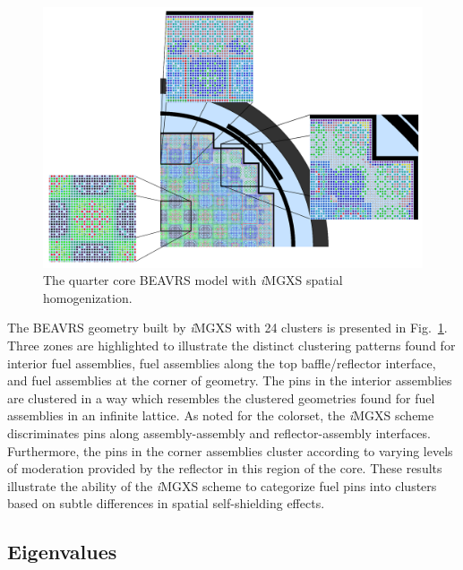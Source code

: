 \documentclass[12pt,twoside]{mitthesis-exec}
\begin{document}
\begin{figure}[h!]
\centering
\includegraphics[width=\linewidth]{figures/unsupervised/geometries/with-features/8-clusters/combined/full-core-zoom}
\caption[Materials for the BEAVRS]{The quarter core BEAVRS model with \textit{i}MGXS spatial homogenization.}
\label{fig:full-core-8-clusters}
\end{figure}

The BEAVRS geometry built by \textit{i}MGXS with 24 clusters is presented in Fig.~\ref{fig:full-core-8-clusters}. Three zones are highlighted to illustrate the distinct clustering patterns found for interior fuel assemblies, fuel assemblies along the top baffle/reflector interface, and fuel assemblies at the corner of geometry. The pins in the interior assemblies are clustered in a way which resembles the clustered geometries found for fuel assemblies in an infinite lattice. As noted for the colorset, the \textit{i}MGXS scheme discriminates pins along assembly-assembly and reflector-assembly interfaces. Furthermore, the pins in the corner assemblies cluster according to varying levels of moderation provided by the reflector in this region of the core. These results illustrate the ability of the \textit{i}MGXS scheme to categorize fuel pins into clusters based on subtle differences in spatial self-shielding effects.

\subsection*{Eigenvalues}
\end{document}
